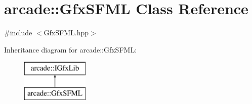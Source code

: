 \hypertarget{classarcade_1_1_gfx_s_f_m_l}{}\section{arcade\+:\+:Gfx\+S\+F\+ML Class Reference}
\label{classarcade_1_1_gfx_s_f_m_l}


{\ttfamily \#include $<$Gfx\+S\+F\+M\+L.\+hpp$>$}

Inheritance diagram for arcade\+:\+:Gfx\+S\+F\+ML\+:\begin{figure}[H]
\begin{center}
\leavevmode
\includegraphics[height=2.000000cm]{classarcade_1_1_gfx_s_f_m_l}
\end{center}
\end{figure}
